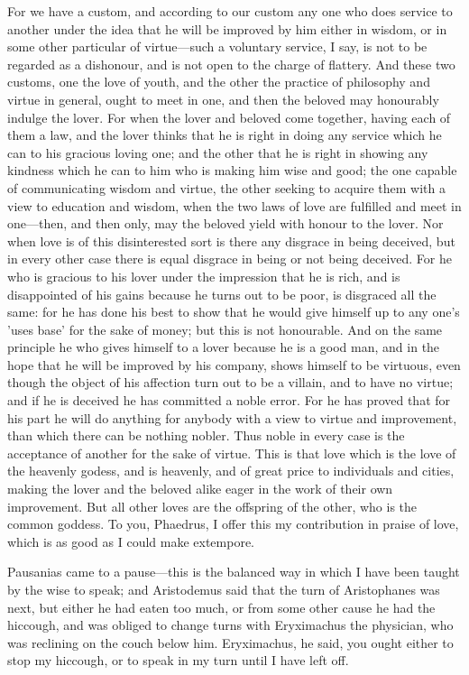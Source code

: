 \documentclass[11pt,letter]{article}
\begin{document}
\par  For we have a custom, and according to our custom any one who does service to another under the idea that he will be improved by him either in wisdom, or in some other particular of virtue—such a voluntary service, I say, is not to be regarded as a dishonour, and is not open to the charge of flattery. And these two customs, one the love of youth, and the other the practice of philosophy and virtue in general, ought to meet in one, and then the beloved may honourably indulge the lover. For when the lover and beloved come together, having each of them a law, and the lover thinks that he is right in doing any service which he can to his gracious loving one; and the other that he is right in showing any kindness which he can to him who is making him wise and good; the one capable of communicating wisdom and virtue, the other seeking to acquire them with a view to education and wisdom, when the two laws of love are fulfilled and meet in one—then, and then only, may the beloved yield with honour to the lover. Nor when love is of this disinterested sort is there any disgrace in being deceived, but in every other case there is equal disgrace in being or not being deceived. For he who is gracious to his lover under the impression that he is rich, and is disappointed of his gains because he turns out to be poor, is disgraced all the same: for he has done his best to show that he would give himself up to any one's 'uses base' for the sake of money; but this is not honourable. And on the same principle he who gives himself to a lover because he is a good man, and in the hope that he will be improved by his company, shows himself to be virtuous, even though the object of his affection turn out to be a villain, and to have no virtue; and if he is deceived he has committed a noble error. For he has proved that for his part he will do anything for anybody with a view to virtue and improvement, than which there can be nothing nobler. Thus noble in every case is the acceptance of another for the sake of virtue. This is that love which is the love of the heavenly godess, and is heavenly, and of great price to individuals and cities, making the lover and the beloved alike eager in the work of their own improvement. But all other loves are the offspring of the other, who is the common goddess. To you, Phaedrus, I offer this my contribution in praise of love, which is as good as I could make extempore.

\par  Pausanias came to a pause—this is the balanced way in which I have been taught by the wise to speak; and Aristodemus said that the turn of Aristophanes was next, but either he had eaten too much, or from some other cause he had the hiccough, and was obliged to change turns with Eryximachus the physician, who was reclining on the couch below him. Eryximachus, he said, you ought either to stop my hiccough, or to speak in my turn until I have left off.
\end{document}
